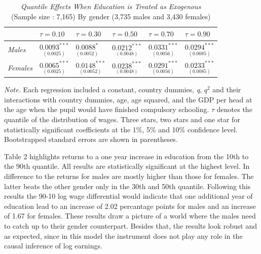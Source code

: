 \documentclass[12pt,a4paper]{article}
\begin{document}
\begin{table}[!htbp]
\captionsetup{labelsep=newline, justification=centering}
  \begin{threeparttable}
       \caption{\textit{Quantile Effects When Education is Treated as Exogenous} \\
    \scriptsize (Sample size : 7,165) By gender (3,735 males and 3,430 females)}
     \begin{tabular}{*{6}{l}}
        \toprule
         & \( \tau=0.10\) & \( \tau= 0.30\) & \( \tau= 0.50\) & \( \tau= 0.70\) & \( \tau= 0.90\) \\
        \midrule
        \addlinespace
        \textit{Males}   & $\underset{(0.0025)}{0.0093^{***}}$ & $\underset{(0.0052)}{0.0088^{*}}$ & $\underset{(0.0048)}{0.0212^{***}}$ & $\underset{(0.0056)}{0.0331^{***}}$ & $\underset{(0.0085)}{0.0294^{***}}$
\\
        \textit{Females}& $\underset{(0.0025)}{0.0065^{***}}$ & $\underset{(0.0052)}{0.0148^{***}}$ & $\underset{(0.0048)}{0.0238^{***}}$ & $\underset{(0.0056)}{0.0291^{***}}$ & $\underset{(0.0085)}{0.0233^{***}}$ \\
        \bottomrule
     \end{tabular}
    \begin{tablenotes}[flushleft]
      \small
      \item \textit{Note.} Each regression included a constant, country dummies, \textit{q}, \textit{$q^2$} and their interactions with country dummies, age, age squared, and the GDP per head at the age when the pupil would have finished compulsory schooling. $\tau$ denotes the quantile of the distribution of wages. Three stars, two stars and one star for statistically significant coefficients at the 1\%, 5\% and 10\% confidence level. Bootstrapped standard errors are shown in parentheses.
    \end{tablenotes}
  \end{threeparttable}
\end{table}

Table 2 highlights returns to a one year increase in education from the
10th to the 90th quantile. All results are statistically significant at
the highest level. In difference to \textcite{brunello} the returns for
males are mostly higher than those for females. The latter beats the
other gender only in the 30th and 50th quantile. Following this results
the 90-10 log wage differential would indicate that one additional year
of education lead to an increase of 2.02 percantage points for males and
an increase of 1.67 for females. These results draw a picture of a world
where the males need to catch up to their gender counterpart. Besides
that, the results look robust and as expected, since in this model the
instrument does not play any role in the causal inference of log
earnings.
\end{document}

